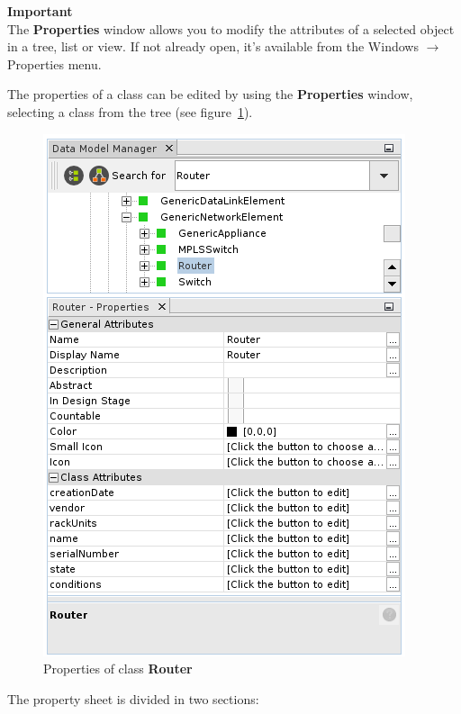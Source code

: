 \documentclass[a4paper]{article}
\begin{document}
			\begin{framed} {\large \textbf{Important}} \\
					The \textbf{Properties} window allows you to modify the attributes of a selected object in a tree, list or view. If not already open, it's available from the Windows $\rightarrow$ Properties menu.
			\end{framed}
			The properties of a class can be edited by using the \textbf{Properties} window, selecting a class from the tree (see figure~\ref{fig:properties_class_node}). 
			\begin{figure}[h!]
				\centering
				\includegraphics[width=0.5\linewidth]{img/data_model_manager_properties_class_node.png}
				\caption{Properties of class \textbf{Router}}
				\label{fig:properties_class_node}
			\end{figure}
			The  property  sheet  is  divided  in  two  sections: 
\end{document}
